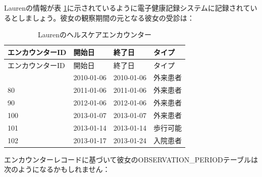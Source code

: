 \documentclass[
  11pt]{book}
\theoremstyle{definition}
\theoremstyle{definition}
\theoremstyle{definition}
\theoremstyle{definition}
\theoremstyle{remark}
\begin{document}
Laurenの情報が表 \ref{tab:encounters}に示されているように電子健康記録システムに記録されているとしましょう。彼女の観察期間の元となる彼女の受診は：

\begin{longtable}[]{@{}llll@{}}
\caption{\label{tab:encounters} Laurenのヘルスケアエンカウンター}\tabularnewline
\toprule\noalign{}
エンカウンターID & 開始日 & 終了日 & タイプ \\
\midrule\noalign{}
\endfirsthead
\toprule\noalign{}
エンカウンターID & 開始日 & 終了日 & タイプ \\
\midrule\noalign{}
\endhead
\bottomrule\noalign{}
\endlastfoot
70 & 2010-01-06 & 2010-01-06 & 外来患者 \\
80 & 2011-01-06 & 2011-01-06 & 外来患者 \\
90 & 2012-01-06 & 2012-01-06 & 外来患者 \\
100 & 2013-01-07 & 2013-01-07 & 外来患者 \\
101 & 2013-01-14 & 2013-01-14 & 歩行可能 \\
102 & 2013-01-17 & 2013-01-24 & 入院患者 \\
\end{longtable}

エンカウンターレコードに基づいて彼女のOBSERVATION\_PERIODテーブルは次のようになるかもしれません：
\end{document}
